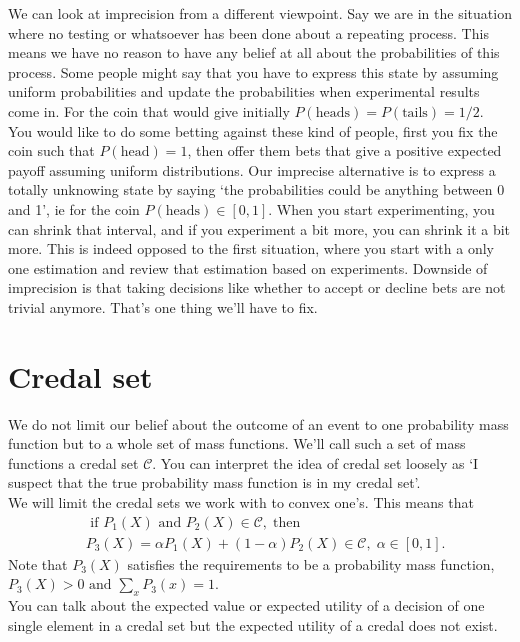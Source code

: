 \documentclass{report}
\theoremstyle{definition}
\begin{document}
We can look at imprecision from a different viewpoint. Say we are in the situation where no testing or whatsoever has been done about a repeating process. This means we have no reason to have any belief at all about the probabilities of this process. Some people might say that you have to express this state by assuming uniform probabilities and update the probabilities when experimental results come in. For the coin that would give initially $P(\text{heads})=P(\text{tails})=1/2$. You would like to do some betting against these kind of people, first you fix the coin such that $P(\text{head})=1$, then offer them bets that give a positive expected payoff assuming uniform distributions. Our imprecise alternative is to express a totally unknowing state by saying \lq the probabilities could be anything between 0 and 1', ie for the coin $P(\text{heads}) \in [0,1]$. When you start experimenting, you can shrink that interval, and if you experiment a bit more, you can shrink it a bit more. This is indeed opposed to the first situation, where you start with a only one estimation and review that estimation based on experiments. Downside of imprecision is that taking decisions like whether to accept or decline bets are not trivial anymore. That's one thing we'll have to fix.

	\section{Credal set}
We do not limit our belief about the outcome of an event to one probability mass function but to a whole set of mass functions. We'll call such a set of mass functions a credal set $\mathcal{C}$. You can interpret the idea of credal set loosely as \lq I suspect that the true probability mass function is in my credal set'.\\
We will limit the credal sets we work with to convex one's. This means that
\begin{equation}
\begin{split}
& \text{ if } P_1(X)  \text{ and } P_2(X) \in \mathcal{C}, \; \text{then} \\
& P_3(X) = \alpha P_1(X) + (1 - \alpha)P_2(X) \in \mathcal{C}, \; \alpha \in [0,1].
\end{split}
\end{equation}
Note that $P_3(X)$ satisfies the requirements to be a probability mass function, $P_3(X)>0 \text{ and } \sum_{x}^{}P_3(x) = 1$.\\
You can talk about the expected value or expected utility of a decision of one single element in a credal set but the expected utility of a credal does not exist.
  
\end{document}
